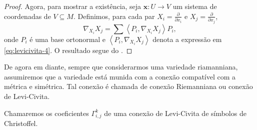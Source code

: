 \begin{theorem}
\begin{proof}
		Agora, para mostrar a existência, seja $\mathbf{x}:U\to V$ um sistema de coordenadas de $V \subseteq M$. Definimos, para cada par $X_{i}=\frac{\partial}{\partial x_{i}}$ e $X_{j}=\frac{\partial}{\partial x_{j}}$,
		\begin{equation*}
			\nabla_{X_{i}}X_{j} = \sum \left<P_{i},\nabla_{X_{i}}X_{j}\right> P_{i},
		\end{equation*}
		onde $P_{i}$ é uma base ortonormal e $\left<P_{i},\nabla_{X_{i}}X_{j}\right>$ denota a expressão em \eqref{eq:levicivita-4}. O resultado segue do .
	\end{proof}
\end{theorem}
De agora em diante, sempre que considerarmos uma variedade riamanniana, assumiremos que a variedade está munida com a conexão compatível com a métrica e simétrica. Tal conexão é chamada de conexão Riemanniana ou conexão de Levi-Civita.

Chamaremos os coeficientes $\Gamma_{i,j}^{k}$ de uma conexão de Levi-Civita de símbolos de Christoffel.

